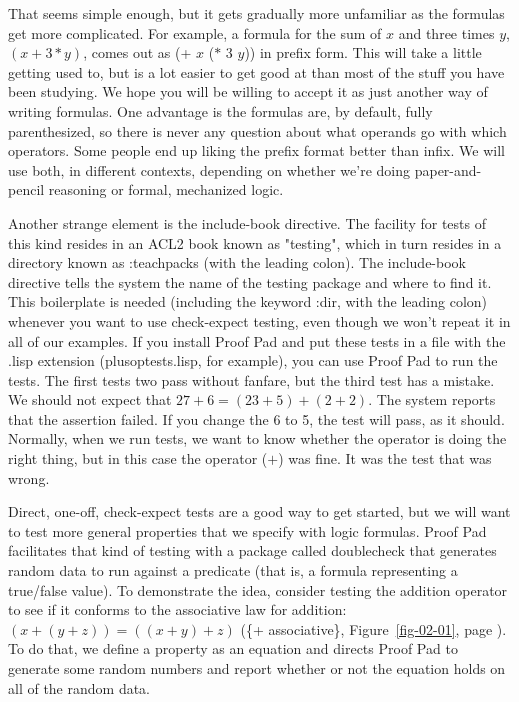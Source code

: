 That seems simple enough, but it gets gradually more unfamiliar
as the formulas get more complicated.
For example, a formula for the sum of $x$ and three times $y$, $(x + 3*y)$,
comes out as (+ $x$ ($*$ $3$ $y$)) in prefix form.
This will take a little getting used to,
but is a lot easier to get good at than
most of the stuff you have been studying.
We hope you will be willing to accept it as just another way of writing formulas.
One advantage is the formulas are, by default, fully parenthesized,
so there is never any question about what operands go with which operators.
Some people end up liking the prefix format better than infix.
We will use both, in different contexts, depending on whether
we're doing paper-and-pencil reasoning or formal, mechanized logic.

Another strange element is the include-book directive.
The facility for tests of this kind resides in an ACL2 book
known as "testing", which in turn resides in a directory known
as :teachpacks (with the leading colon).
The include-book directive tells the system
the name of the testing package and where to find it.
This boilerplate is needed (including the keyword :dir, with the leading colon)
whenever you want to use check-expect testing,
even though we won't repeat it in all of our examples.
If you install Proof Pad and put these tests in a file
with the .lisp extension (plusoptests.lisp, for example),
you can use Proof Pad to run the tests.
The first tests two pass without fanfare,
but the third test has a mistake.
We should not expect that $27 + 6 = (23 + 5) + (2 + 2)$.
The system reports that the assertion failed.
If you change the 6 to 5, the test will pass, as it should.
Normally, when we run tests, we want to know whether the
operator is doing the right thing,
but in this case the operator ($+$) was fine.
It was the test that was wrong.

Direct, one-off, check-expect tests
are a good way to get started, but
we will want to test more general properties that we specify with logic formulas.
Proof Pad facilitates that kind of testing with a package called doublecheck
that generates random data to run against a predicate
(that is, a formula representing a true/false value).
To demonstrate the idea, consider testing the addition operator to see if
it conforms to the associative law for addition: $(x + (y + z)) = ((x + y) + z)$
(\{+ associative\}, Figure~\ref{fig-02-01}, page \pageref{fig-02-01}).
To do that, we define a property as an equation
and directs Proof Pad to generate some random numbers and
report whether or not the equation holds on all of the random data.

